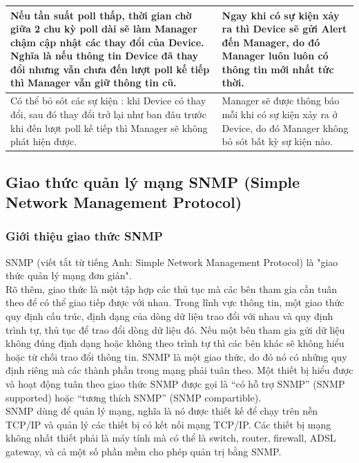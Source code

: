 \documentclass[12pt,oneside,a4paper]{article}
\begin{document}
\begin{longtable}{|p{8cm}|p{8cm}|}
Nếu tần suất poll thấp, thời gian chờ giữa 2 chu kỳ poll dài sẽ làm Manager chậm cập nhật các thay đổi của Device. Nghĩa là nếu thông tin Device đã thay đổi nhưng vẫn chưa đến lượt poll kế tiếp thì Manager vẫn giữ thông tin cũ.                            & Ngay khi có sự kiện xảy ra thì Device sẽ gửi Alert đến Manager, do đó Manager luôn luôn có thông tin mới nhất tức thời.                                                                                                                       \\ \hline
Có thể bỏ sót các sự kiện : khi Device có thay đổi, sau đó thay đổi trở lại như ban đâu trước khi đến lượt poll kế tiếp thì Manager sẽ không phát hiện được.                                                                                                   & Manager sẽ được thông báo mỗi khi có sự kiện xảy ra ở Device, do đó Manager không bỏ sót bất kỳ sự kiện nào.                                                                                                                                  \\ \hline
\end{longtable}
\subsection{Giao thức quản lý mạng SNMP (Simple Network Management Protocol)}
\subsubsection{Giới thiệu giao thức SNMP}
SNMP (viết tắt từ tiếng Anh: Simple Network Management Protocol) là "giao thức quản lý mạng đơn giản".\\

Rõ thêm, giao thức là một tập hợp các thủ tục mà các bên tham gia cần tuân theo để có thể giao tiếp được với nhau. Trong lĩnh vực thông tin, một giao thức quy định cấu trúc, định dạng của dòng dữ liệu trao đổi với nhau và quy định trình tự, thủ tục để trao đổi dòng dữ liệu đó. Nếu một bên tham gia gửi dữ liệu không đúng định dạng hoặc không theo trình tự thì các bên khác sẽ không hiểu hoặc từ chối trao đổi thông tin. SNMP là một giao thức, do đó nó có những quy định riêng mà các thành phần trong mạng phải tuân theo. Một thiết bị hiểu được và hoạt động tuân theo giao thức SNMP được gọi là “có hỗ trợ SNMP” (SNMP supported) hoặc “tương thích SNMP” (SNMP compartible).\\

SNMP dùng để quản lý mạng, nghĩa là nó được thiết kế để chạy trên nền TCP/IP và quản lý các thiết bị có kết nối mạng TCP/IP. Các thiết bị mạng không nhất thiết phải là máy tính mà có thể là switch, router, firewall, ADSL gateway, và cả một số phần mềm cho phép quản trị bằng SNMP.\\
\end{document}
